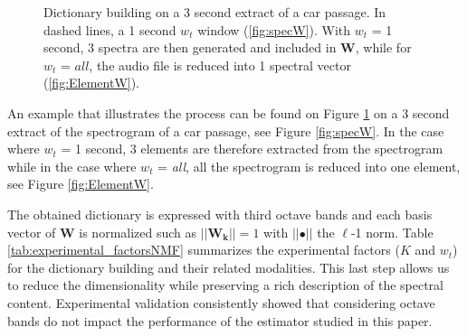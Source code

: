 \documentclass[twocolumn]{svjour3}          %
\begin{document}
\begin{figure}[htp]
  \centering
  \hspace{5pt}
  \caption{Dictionary building on a 3 second extract of a car passage. In dashed lines, a 1 second $w_t$ window  (\ref{fig:specW}). With $w_t$ = 1 second, 3 spectra are then generated and included in $\mathbf{W}$, while for $w_t$ = $all$, the audio file is reduced into 1 spectral vector (\ref{fig:ElementW}).}
  \label{fig:spec_elementW}
\end{figure}


An example that illustrates the process can be found on Figure \ref{fig:spec_elementW} on a 3 second extract of the spectrogram of a car passage, see Figure \ref{fig:specW}. In the case where $w_t$ = 1 second, 3 elements are therefore extracted from the spectrogram while in the case where $w_t$ = \textit{all}, all the spectrogram is reduced into one element, see Figure \ref{fig:ElementW}.

The obtained dictionary is expressed with third octave bands and each basis vector of $\mathbf{W}$ is normalized such as $\vert \vert \mathbf{W_k} \vert \vert = 1$ with $\vert \vert \bullet \vert\vert$ the $\ell$-1 norm. Table \ref{tab:experimental_factorsNMF} summarizes the experimental factors ($K$ and $w_t$) for the dictionary building and their related modalities. This last step allows us to reduce the dimensionality while preserving a rich description of the spectral content. Experimental validation consistently showed that considering octave bands do not impact the performance of the estimator studied in this paper.
\end{document}
